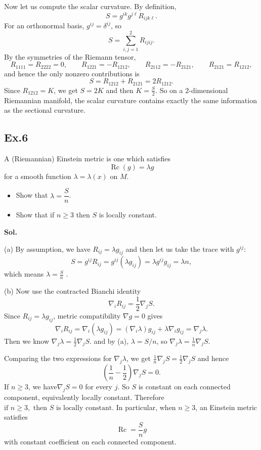 \documentclass[lang=en,11pt,a4paper,citestyle =authoryear]{elegantpaper}
\newcommand{\Rc}{\operatorname{Rc}}
\begin{document}
Now let us compute the scalar curvature. By definition,
\[
S=g^{ik}g^{j\ell}R_{ijk\ell}.
\]
For an orthonormal basis, $g^{ij}=\delta^{ij}$, so
\[
S=\sum_{i,j=1}^2 R_{ijij}.
\]
By the symmetries of the Riemann tensor,
\[
R_{1111}=R_{2222}=0,
\qquad
R_{1221}=-R_{1212},
\qquad
R_{2112}=-R_{2121},
\qquad
R_{2121}=R_{1212},
\]
and hence the only nonzero contributions is
\[
S=R_{1212}+R_{2121}=2R_{1212}.
\]
Since $R_{1212}=K$, we get
\(
S=2K
\)
and then
\(
K=\frac{S}{2}
\). So on a $2$-dimensional Riemannian manifold, the scalar curvature contains exactly the same information as the sectional curvature.\par

\subsection*{Ex.6}
A (Riemannian) Einstein metric is one which satisfies
\[
\Rc(g)=\lambda g
\]
for a smooth function $\lambda=\lambda(x)$ on $M$.
\begin{itemize}
    \item[(a)] Show that $\lambda=\dfrac{S}{n}$.
    \item[(b)] Show that if $n\ge 3$ then $S$ is locally constant.
\end{itemize}
\textbf{Sol.} \par
(a) By assumption, we have
\(
R_{ij}=\lambda g_{ij}
\) and then let us take the trace with $g^{ij}$:
\[
S=g^{ij}R_{ij}=g^{ij}(\lambda g_{ij})=\lambda g^{ij}g_{ij}=\lambda n,
\]
which means
\(
\lambda=\frac{S}{n}
\)
.

(b) Now use the contracted Bianchi identity
\[
\nabla_i R_{ij}=\frac12\nabla_j S.
\]
Since $R_{ij}=\lambda g_{ij}$, metric compatibility $\nabla g=0$ gives
\[
\nabla_i R_{ij}=\nabla_i(\lambda g_{ij})=(\nabla_i\lambda)g_{ij}+\lambda\nabla_i g_{ij}=\nabla_j\lambda.
\]
Then we know
\(
\nabla_j\lambda=\frac12\nabla_j S.
\)
and by (a), $\lambda=S/n$, so
\(
\nabla_j\lambda=\frac1n\nabla_j S
\).

Comparing the two expressions for $\nabla_j\lambda$, we get
\(
\frac1n\nabla_j S=\frac12\nabla_j S
\) and hence
\[
\left(\frac1n-\frac12\right)\nabla_j S=0.
\]
If $n\ge 3$, we have\(
\nabla_j S=0
\)
for every $j$. So $S$ is constant on each connected component, equivalently locally constant. Therefore
\(
\text{if }n\ge 3,\text{ then }S\text{ is locally constant}.
\)
In particular, when $n\ge 3$, an Einstein metric satisfies
\[
\Rc=\frac{S}{n}g
\]
with constant coefficient on each connected component.\par


\addappheadtotoc
\end{document}
